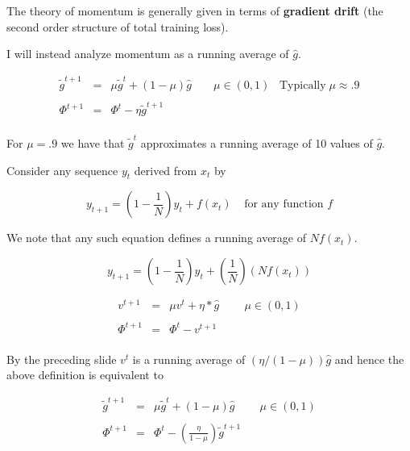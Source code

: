 {\vfill
The theory of momentum is generally given in terms of {\bf gradient drift} (the second order structure of total training loss).

\vfill
I will instead analyze momentum as a running average of $\hat{g}$.


\begin{eqnarray*}
  \tilde{g}^{t+1} & = & \mu \tilde{g}^t + (1-\mu)\hat{g}  \;\;\;\;\;\;\;\mu\in (0,1)\;\;\;\mbox{Typically}\;\mu \approx .9 \\
  \\
  \Phi^{t+1} & = & \Phi^t - \eta\tilde{g}^{t+1} \\
\end{eqnarray*}

\vfill
For $\mu = .9$ we have that $\tilde{g}^t$ approximates a running average of 10 values of $\hat{g}$.


Consider any sequence $y_t$ derived from $x_t$ by

$$y_{t+1} = \left(1-\frac{1}{N}\right) y_t + f(x_t)\;\;\;\;\mbox{for any function $f$}$$

\vfill
We note that any such equation defines a running average of $Nf(x_t)$.

$$y_{t+1} = \left(1-\frac{1}{N}\right)y_t + \left(\frac{1}{N}\right)(N f(x_t))$$


\begin{eqnarray*}
  v^{t+1} & = & \mu v^t + \eta * \hat{g}  \;\;\;\;\;\;\;\;\mu \in (0,1) \\
  \\
  \Phi^{t+1} & = & \Phi^t -  v^{t+1} \\
\end{eqnarray*}


\vfill
By the preceding slide $v^t$ is a running average of $(\eta/(1-\mu))\hat{g}$ and hence the above definition is equivalent to

\begin{eqnarray*}
  \tilde{g}^{t+1} & = & \mu \tilde{g}^t + (1-\mu) \hat{g}  \;\;\;\;\;\;\;\;\mu \in (0,1) \\
  \\
  \Phi^{t+1} & = & \Phi^t -  \left(\frac{\eta}{1-\mu}\right)\tilde{g}^{t+1} \\
\end{eqnarray*}

}
